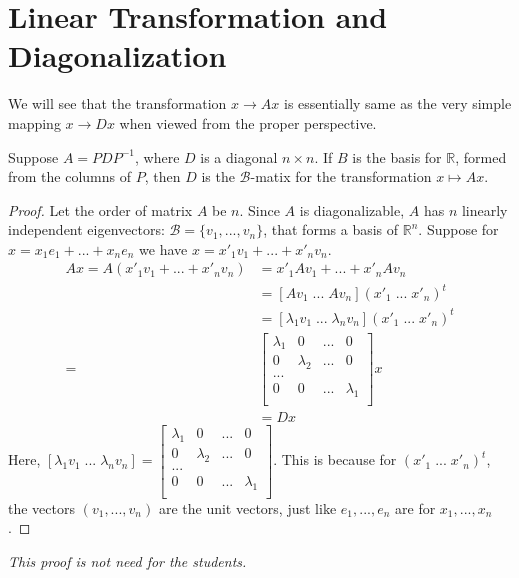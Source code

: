 \documentclass[aima104_lecturenotes_ku.tex]{subfiles}
\begin{document}
\section{Linear Transformation and Diagonalization}
We will see that the transformation $x \to  Ax$ is essentially same as the very simple mapping $x \to Dx$ when viewed from the proper perspective.
\begin{theorem}
  Suppose $A = PDP^{-1}$, where $D$ is a diagonal $n \times n$. If $B$ is the basis for $\mathbb{R}$, formed from the columns of $P$, then $D$ is the $\mathcal{B}$-matix for the transformation $x \mapsto Ax$.
\end{theorem}
\begin{proof}
  Let the order of matrix $A$ be $n$. Since $A$ is diagonalizable, $A$ has $n$ linearly independent eigenvectors: $\mathcal{B}=\{v_1, ..., v_n\}$, that forms a basis of $\mathbb{R}^n$.
  Suppose for $x=x_1e_1 + ... + x_ne_n$ we have $x = x'_1v_1 + ...+ x'_nv_n$.
  \begin{equation}
    \label{diaglinear}
    \begin{aligned}
      Ax = A(x'_1v_1 + ...+ x'_nv_n) &= x'_1Av_1 + ... +x'_nAv_n \\[1mm]
                                      &= [Av_1 \; ... \; Av_n](x'_1 \; ... \; x'_n)^t \\[1mm]
                                      &=[\lambda_1 v_1 \; ... \; \lambda_n v_n](x'_1 \; ... \; x'_n)^t \\[1mm]
      =& \begin{bmatrix}
  \lambda_1 & 0 & ... & 0 \\
  0 & \lambda_2 & ... & 0 \\
  ... \\
  0 & 0 & ... & \lambda_1 \\
      \end{bmatrix}x \\[1mm]
      &= Dx
    \end{aligned}
  \end{equation}
  Here, $\displaystyle [\lambda_1 v_1 \; ... \; \lambda_n v_n] = \begin{bmatrix}
  \lambda_1 & 0 & ... & 0 \\
  0 & \lambda_2 & ... & 0 \\
  ... \\
  0 & 0 & ... & \lambda_1 \\
\end{bmatrix}$. This is because for $(x'_1 \; ... \; x'_n)^t$, the vectors $(v_1, ..., v_n)$ are the unit vectors, just like $e_1, ..., e_n$ are for $x_1, ..., x_n$.
\end{proof}
\begin{remark}
  \textit{This proof is not need for the students.}
\end{remark}
\end{document}
